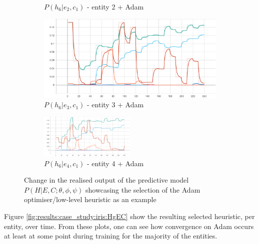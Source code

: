 \begin{figure}[htbp]
\begin{subfigure}{0.5\textwidth}
        \caption{$P\left(h_{6}|e_{2},c_{1}\right)$ - entity 2 + \Acs{Adam} }
        \label{fig:results:case_study:iris:p_HgEC:2:6}
    \end{subfigure}
    \begin{subfigure}{0.5\textwidth}
        \centering
        \includegraphics[width=\textwidth]{analysis/bhh_case_study/iris/p_HgEC[3][6].png}
        \caption{$P\left(h_{6}|e_{3},c_{1}\right)$ - entity 3 + \Acs{Adam} }
        \label{fig:results:case_study:iris:p_HgEC:3:6}
    \end{subfigure}
    \par\bigskip
    \begin{subfigure}{\textwidth}
        \centering
        \includegraphics[width=0.5\textwidth]{analysis/bhh_case_study/iris/p_HgEC[4][6].png}
        \caption{$P\left(h_{6}|e_{4},c_{1}\right)$ - entity 4 + \Acs{Adam} }
        \label{fig:results:case_study:iris:p_HgEC:4:6}
    \end{subfigure}
    \par\bigskip
    \caption{Change in the realised output of the predictive model $P\left(H|E,C;\theta,\phi,\psi \right)$ showcasing the selection of the \Acs{Adam} optimiser/low-level heuristic as an example}
    \label{fig:results:case_study:iris:p_HgEC}
\end{figure}

Figure \ref{fig:results:case_study:iris:HgEC} show the resulting selected heuristic, per entity, over time. From these plots, one can see how convergence on \Acs{Adam} occurs at least at some point during training for the majority of the entities.


